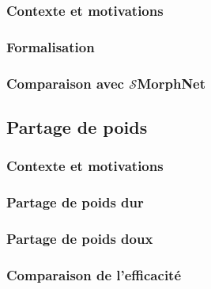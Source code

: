 \documentclass[12pt, twoside, letterpaper, french]{article}
\begin{document}
\subsubsection{Contexte et motivations}
\vspace{0.2cm}

\newpage

\subsubsection{Formalisation}
\vspace{0.2cm}

\newpage

\subsubsection{Comparaison avec $\mathcal{S}$MorphNet}
\vspace{0.2cm}

\newpage

\subsection{Partage de poids} %

\subsubsection{Contexte et motivations}
\vspace{0.2cm}

\newpage

\subsubsection{Partage de poids dur}
\vspace{0.2cm}

\newpage

\subsubsection{Partage de poids doux}
\vspace{0.2cm}


\subsubsection{Comparaison de l'efficacité}
\vspace{0.2cm}

\newpage
\end{document}
